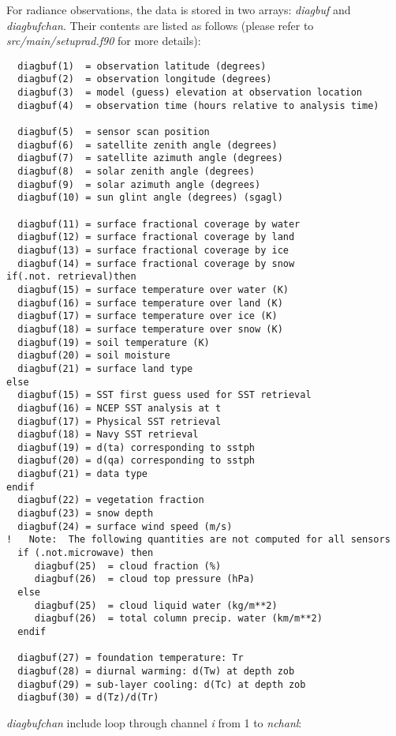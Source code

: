 For radiance observations, the data is stored in two arrays: \textit{diagbuf} and \textit{diagbufchan}. Their contents are listed as follows (please refer to \textit{src/main/setuprad.f90} for more details):
\begin{scriptsize}
\begin{verbatim}  
  diagbuf(1)  = observation latitude (degrees)
  diagbuf(2)  = observation longitude (degrees)
  diagbuf(3)  = model (guess) elevation at observation location
  diagbuf(4)  = observation time (hours relative to analysis time)

  diagbuf(5)  = sensor scan position
  diagbuf(6)  = satellite zenith angle (degrees)
  diagbuf(7)  = satellite azimuth angle (degrees)
  diagbuf(8)  = solar zenith angle (degrees)
  diagbuf(9)  = solar azimuth angle (degrees)
  diagbuf(10) = sun glint angle (degrees) (sgagl)

  diagbuf(11) = surface fractional coverage by water
  diagbuf(12) = surface fractional coverage by land
  diagbuf(13) = surface fractional coverage by ice
  diagbuf(14) = surface fractional coverage by snow
if(.not. retrieval)then
  diagbuf(15) = surface temperature over water (K)
  diagbuf(16) = surface temperature over land (K)
  diagbuf(17) = surface temperature over ice (K)
  diagbuf(18) = surface temperature over snow (K)
  diagbuf(19) = soil temperature (K)
  diagbuf(20) = soil moisture
  diagbuf(21) = surface land type
else
  diagbuf(15) = SST first guess used for SST retrieval
  diagbuf(16) = NCEP SST analysis at t
  diagbuf(17) = Physical SST retrieval
  diagbuf(18) = Navy SST retrieval
  diagbuf(19) = d(ta) corresponding to sstph
  diagbuf(20) = d(qa) corresponding to sstph
  diagbuf(21) = data type
endif
  diagbuf(22) = vegetation fraction
  diagbuf(23) = snow depth
  diagbuf(24) = surface wind speed (m/s)
!   Note:  The following quantities are not computed for all sensors
  if (.not.microwave) then
     diagbuf(25)  = cloud fraction (%)
     diagbuf(26)  = cloud top pressure (hPa)
  else
     diagbuf(25)  = cloud liquid water (kg/m**2)
     diagbuf(26)  = total column precip. water (km/m**2)
  endif

  diagbuf(27) = foundation temperature: Tr
  diagbuf(28) = diurnal warming: d(Tw) at depth zob
  diagbuf(29) = sub-layer cooling: d(Tc) at depth zob
  diagbuf(30) = d(Tz)/d(Tr)
\end{verbatim}
\end{scriptsize}

\textit{diagbufchan} include loop through channel \textit{i} from 1 to \textit{nchanl}:

